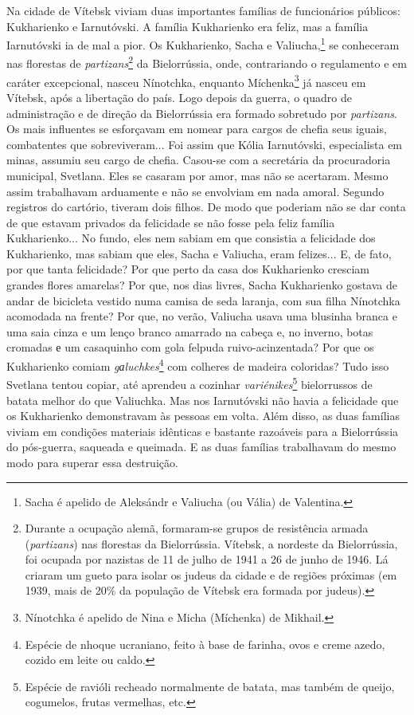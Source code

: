 Na cidade de Vítebsk viviam duas importantes famílias de funcionários
públicos: Kukharienko e Iarnutóvski. A família Kukharienko era feliz,
mas a família Iarnutóvski ia de mal a pior. Os Kukharienko, Sacha e
Valiucha,\footnote{Sacha é apelido de Aleksándr e Valiucha (ou Vália) de
  Valentina.} se conheceram nas florestas de \emph{partizans}\footnote{Durante
  a ocupação alemã, formaram-se grupos de resistência armada
  (\emph{partizans}) nas florestas da Bielorrússia. Vítebsk, a nordeste
  da Bielorrússia, foi ocupada por nazistas de 11 de julho de 1941 a 26
  de junho de 1946. Lá criaram um gueto para isolar os judeus da cidade
  e de regiões próximas (em 1939, mais de 20\% da população de Vítebsk
  era formada por judeus).} da Bielorrússia, onde, contrariando o
regulamento e em caráter excepcional, nasceu Nínotchka, enquanto
Míchenka\footnote{Nínotchka é apelido de Nina e Micha (Míchenka) de
  Mikhail.} já nasceu em Vítebsk, após a libertação do país. Logo depois
da guerra, o quadro de administração e de direção da Bielorrússia era
formado sobretudo por \emph{partizans}. Os mais influentes se esforçavam
em nomear para cargos de chefia seus iguais, combatentes que
sobreviveram... Foi assim que Kólia Iarnutóvski, especialista em minas,
assumiu seu cargo de chefia. Casou-se com a secretária da procuradoria
municipal, Svetlana. Eles se casaram por amor, mas não se acertaram.
Mesmo assim trabalhavam arduamente e não se envolviam em nada amoral.
Segundo registros do cartório, tiveram dois filhos. De modo que poderiam
não se dar conta de que estavam privados da felicidade se não fosse pela
feliz família Kukharienko... No fundo, eles nem sabiam em que consistia
a felicidade dos Kukharienko, mas sabiam que eles, Sacha e Valiucha,
eram felizes... E, de fato, por que tanta felicidade? Por que perto da
casa dos Kukharienko cresciam grandes flores amarelas? Por que, nos dias
livres, Sacha Kukharienko gostava de andar de bicicleta vestido numa
camisa de seda laranja, com sua filha Nínotchka acomodada na frente? Por
que, no verão, Valiucha usava uma blusinha branca e uma saia cinza e um
lenço branco amarrado na cabeça e, no inverno, botas cromadas е um
casaquinho com gola felpuda ruivo-acinzentada? Por que os Kukharienko
comiam \emph{gаluchkes}\footnote{Espécie de nhoque ucraniano, feito à
  base de farinha, ovos e creme azedo, cozido em leite ou caldo.} com
colheres de madeira coloridas? Tudo isso Svetlana tentou copiar, até
aprendeu a cozinhar \emph{variénikes}\footnote{Espécie de ravióli
  recheado normalmente de batata, mas também de queijo, cogumelos,
  frutas vermelhas, etc.} bielorrussos de batata melhor do que
Valiuchka. Mas nos Iarnutóvski não havia a felicidade que os Kukharienko
demonstravam às pessoas em volta. Além disso, as duas famílias viviam em
condições materiais idênticas e bastante razoáveis para a Bielorrússia
do pós-guerra, saqueada e queimada. E as duas famílias trabalhavam do
mesmo modo para superar essa destruição.

